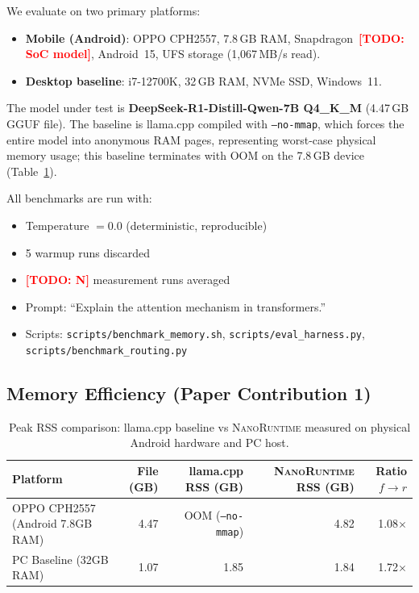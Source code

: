 \documentclass[11pt]{article}
\newcommand{\TODO}[1]{\textcolor{red}{\textbf{[TODO: #1]}}}
\newcommand{\nanort}{\textsc{NanoRuntime}}
\begin{document}
We evaluate on two primary platforms:
\begin{itemize}
  \item \textbf{Mobile (Android)}: OPPO CPH2557,
    7.8\,GB RAM, Snapdragon~\TODO{SoC model},
    Android~15, UFS storage (1,067\,MB/s read).
  \item \textbf{Desktop baseline}: i7-12700K,
    32\,GB RAM, NVMe SSD, Windows~11.
\end{itemize}

The model under test is \textbf{DeepSeek-R1-Distill-Qwen-7B Q4\_K\_M}
(4.47\,GB GGUF file).
The baseline is llama.cpp compiled with \texttt{--no-mmap},
which forces the entire model into anonymous RAM pages,
representing worst-case physical memory usage; this baseline
terminates with OOM on the 7.8\,GB device (Table~\ref{tab:rss}).

All benchmarks are run with:
\begin{itemize}
  \item Temperature $= 0.0$ (deterministic, reproducible)
  \item 5 warmup runs discarded
  \item \TODO{N} measurement runs averaged
  \item Prompt: ``Explain the attention mechanism in transformers.''
  \item Scripts: \texttt{scripts/benchmark\_memory.sh},
    \texttt{scripts/eval\_harness.py},
    \texttt{scripts/benchmark\_routing.py}
\end{itemize}

\subsection{Memory Efficiency (Paper Contribution 1)}
\label{sec:mem_results}

\begin{table}[h]
\centering
\caption{Peak RSS comparison: llama.cpp baseline vs \nanort{} measured on physical Android hardware and PC host.}
\label{tab:rss}
\begin{tabular}{lrrrr}
\toprule
Platform & File (GB) & llama.cpp RSS (GB) & \nanort{} RSS (GB) & Ratio $f{\to}r$ \\
\midrule
OPPO CPH2557 (Android 7.8GB RAM) & 4.47 & OOM (\texttt{--no-mmap}) & 4.82 & 1.08$\times$ \\
PC Baseline (32GB RAM) & 1.07 & 1.85 & 1.84 & 1.72$\times$ \\
\bottomrule
\end{tabular}
\end{table}
\end{document}
